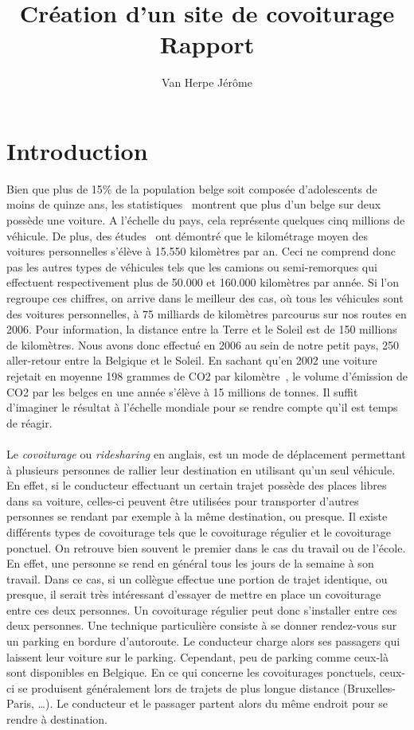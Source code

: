 \documentclass[12pt, a4paper, oneside]{article}
\title{Création d'un site de covoiturage\\ \bigskip{} Rapport}
\author{Van Herpe Jérôme}
\begin{document}
\maketitle
\newpage
\null
\newpage
\renewcommand{\leftmark}{TABLE DES MATI\`{E}RES}
\thispagestyle{fancy}
\tableofcontents
\newpage
\section{Introduction}
    Bien que plus de 15$\%$ de la population belge soit composée d'adolescents de moins de quinze ans, les statistiques~\cite{stats-mondiale} montrent que plus d'un belge sur deux possède une voiture. A l'échelle du pays, cela représente quelques cinq millions de véhicule. De plus, des études~\cite{stats-ecologie} ont démontré que le kilométrage moyen des voitures personnelles s'élève à 15.550 kilomètres par an. Ceci ne comprend donc pas les autres types de véhicules tels que les camions ou semi-remorques qui effectuent respectivement plus de 50.000 et 160.000 kilomètres par année. Si l'on regroupe ces chiffres, on arrive dans le meilleur des cas, où tous les véhicules sont des voitures personnelles, à 75 milliards de kilomètres parcourus sur nos routes en 2006. Pour information, la distance entre la Terre et le Soleil est de 150 millions de kilomètres. Nous avons donc effectué en 2006 au sein de notre petit pays, 250 aller-retour entre la Belgique et le Soleil. En sachant qu'en 2002 une voiture rejetait en moyenne 198 grammes de CO2 par kilomètre~\cite{stats-co2}, le volume d'émission de CO2 par les belges en une année s'élève à 15 millions de tonnes. Il suffit d'imaginer le résultat à l'échelle mondiale pour se rendre compte qu'il est temps de réagir.\\\\
    \indent Le \textit{covoiturage} ou \textit{ridesharing} en anglais, est un mode de déplacement permettant à plusieurs personnes de rallier leur destination en utilisant qu'un seul véhicule. En effet, si le conducteur effectuant un certain trajet possède des places libres dans sa voiture, celles-ci peuvent être utilisées pour transporter d'autres personnes se rendant par exemple à la même destination, ou presque. Il existe différents types de covoiturage tels que le covoiturage régulier et le covoiturage ponctuel. On retrouve bien souvent le premier dans le cas du travail ou de l'école. En effet, une personne se rend en général tous les jours de la semaine à son travail. Dans ce cas, si un collègue effectue une portion de trajet identique, ou presque, il serait très intéressant d'essayer de mettre en place un covoiturage entre ces deux personnes. Un covoiturage régulier peut donc s'installer entre ces deux personnes. Une technique particulière consiste à se donner rendez-vous sur un parking en bordure d'autoroute. Le conducteur charge alors ses passagers qui laissent leur voiture sur le parking. Cependant, peu de parking comme ceux-là sont disponibles en Belgique. En ce qui concerne les covoiturages ponctuels, ceux-ci se produisent généralement lors de trajets de plus longue distance (Bruxelles-Paris, \dots). Le conducteur et le passager partent alors du même endroit pour se rendre à destination.\\\\
\end{document}
